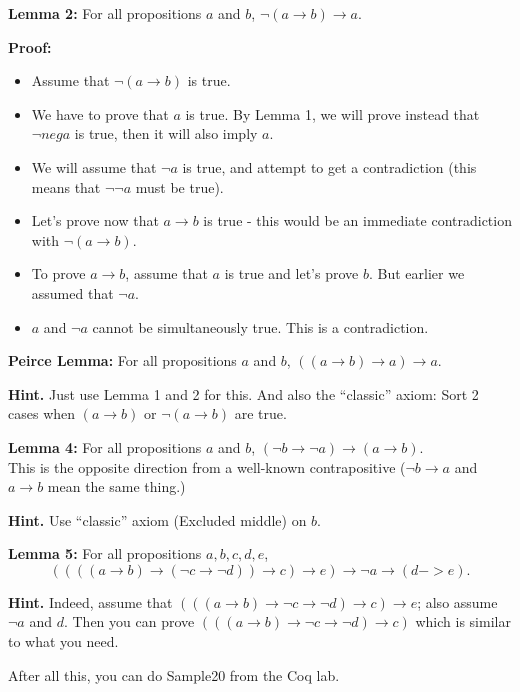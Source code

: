 \documentclass[jou]{apa6}
\begin{document}
{\bf Lemma 2:} For all propositions $a$ and $b$, $\neg(a \rightarrow b) \rightarrow a$. 

{\bf Proof:}

\begin{itemize}
\item Assume that $\neg (a \rightarrow b)$ is true. 
\item We have to prove that $a$ is true. By Lemma 1, we will prove instead that $\neg neg a$ is true, 
then it will also imply $a$. 
\item We will assume that $\neg a$ is true, and attempt to get a contradiction (this means that $\neg \neg a$ must
be true). 
\item Let's prove now that $a \rightarrow b$ is true - this would be an immediate 
contradiction with $\neg (a \rightarrow b)$. 
\item To prove $a \rightarrow b$, assume that $a$ is true and let's prove $b$. But earlier
we assumed that $\neg a$. 
\item $a$ and $\neg a$ cannot be simultaneously true. This is a contradiction.
\end{itemize}

{\bf Peirce Lemma:} For all propositions $a$ and $b$, $((a \rightarrow b) \rightarrow a) \rightarrow a$.

{\bf Hint.} Just use Lemma 1 and 2 for this. And also the ``classic'' axiom: Sort 2 cases when $(a \rightarrow b)$
or $\neg (a \rightarrow b)$ are true.


{\bf Lemma 4:} For all propositions $a$ and $b$, $(\neg b \rightarrow \neg a) \rightarrow (a \rightarrow b)$.\\
This is the opposite direction from a well-known contrapositive ($\neg b \rightarrow a$ and $a \rightarrow b$
mean the same thing.)

{\bf Hint.} Use ``classic'' axiom (Excluded middle) on $b$. 

{\bf Lemma 5:} For all propositions $a,b,c,d,e$, 
$$((((a \rightarrow b) \rightarrow  (\neg c \rightarrow  \neg d)) \rightarrow  c) \rightarrow  e) \rightarrow \neg  a \rightarrow  (d -> e).$$

{\bf Hint.} Indeed, assume that $(((a \rightarrow  b) \rightarrow  \neg c \rightarrow  \neg d)\rightarrow  c) \rightarrow  e$; 
also assume $\neg a$ and $d$. Then you can prove $(((a \rightarrow b) \rightarrow \neg c \rightarrow \neg d) \rightarrow c)$ which is similar to what you need.

After all this, you can do Sample20 from the Coq lab.
\end{document}
